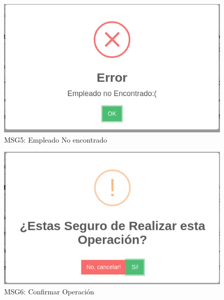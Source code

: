 \begin{figure}[htbp!]
	\begin{center}
		\includegraphics[scale=.5]{Pantallas/empleadoNoEncontrado}
		\caption{MSG5: Empleado No encontrado}
	\end{center}
\end{figure}

\begin{figure}[htbp!]
	\begin{center}
		\includegraphics[scale=.5]{Pantallas/ConfirmacionOperacion}
		\caption{MSG6: Confirmar Operación}
	\end{center}
\end{figure}